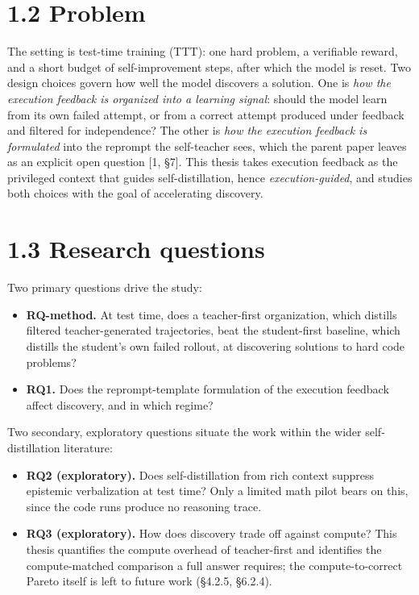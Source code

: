 \section{1.2 Problem}\label{problem}

The setting is test-time training (TTT): one hard problem, a verifiable reward, and a short budget of self-improvement steps, after which the model is reset. Two design choices govern how well the model discovers a solution. One is \emph{how the execution feedback is organized into a learning signal}: should the model learn from its own failed attempt, or from a correct attempt produced under feedback and filtered for independence? The other is \emph{how the execution feedback is formulated} into the reprompt the self-teacher sees, which the parent paper leaves as an explicit open question {[}1, §7{]}. This thesis takes execution feedback as the privileged context that guides self-distillation, hence \emph{execution-guided}, and studies both choices with the goal of accelerating discovery.

\section{1.3 Research questions}\label{research-questions}

Two primary questions drive the study:

\begin{itemize}
\tightlist
\item
  \textbf{RQ-method.} At test time, does a teacher-first organization, which distills filtered teacher-generated trajectories, beat the student-first baseline, which distills the student's own failed rollout, at discovering solutions to hard code problems?
\item
  \textbf{RQ1.} Does the reprompt-template formulation of the execution feedback affect discovery, and in which regime?
\end{itemize}

Two secondary, exploratory questions situate the work within the wider self-distillation literature:

\begin{itemize}
\tightlist
\item
  \textbf{RQ2 (exploratory).} Does self-distillation from rich context suppress epistemic verbalization at test time? Only a limited math pilot bears on this, since the code runs produce no reasoning trace.
\item
  \textbf{RQ3 (exploratory).} How does discovery trade off against compute? This thesis quantifies the compute overhead of teacher-first and identifies the compute-matched comparison a full answer requires; the compute-to-correct Pareto itself is left to future work (§4.2.5, §6.2.4).
\end{itemize}

